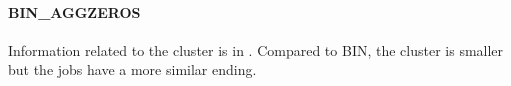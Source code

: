 \documentclass{jhps}
\makeatletter
\newcommand{\jk}[1]{\todo[inline]{JK:\@#1}}
\newcommand{\eb}[1]{\todo[inline, color=GreenYellow]{EB:\@#1}}
\makeatother
\begin{document}
\FloatBarrier
\paragraph{BIN\_AGGZEROS}
Information related to the cluster is in .
Compared to BIN, the cluster is smaller but the jobs have a more similar ending.

\end{document}

